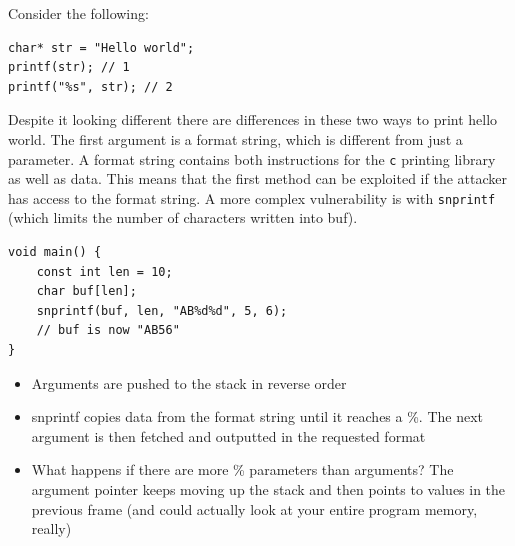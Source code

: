 \documentclass[../notes.tex]{subfiles}
\begin{document}
Consider the following:

\begin{listing}[H]
\begin{verbatim}
char* str = "Hello world";
printf(str); // 1
printf("%s", str); // 2
\end{verbatim}
\end{listing}

Despite it looking different there are differences in these two ways to print hello world.
The first argument is a format string, which is different from just a parameter.
A format string contains both instructions for the \texttt{c} printing library as well as data.
This means that the first method can be exploited if the attacker has access to the format string.
A more complex vulnerability is with \texttt{snprintf} (which limits the number of characters written into buf).



\begin{listing}[H]
\begin{verbatim}
void main() {
    const int len = 10;
    char buf[len];
    snprintf(buf, len, "AB%d%d", 5, 6);
    // buf is now "AB56"
}
\end{verbatim}
\end{listing}

\begin{itemize}
    \item Arguments are pushed to the stack in reverse order
    \item snprintf copies data from the format string until it reaches a \%. The next argument is then fetched and outputted in the requested format
    \item What happens if there are more \% parameters than arguments? The argument pointer keeps moving up the stack and then points to values in the previous frame (and could actually look at your entire program memory, really)
\end{itemize}
\end{document}
